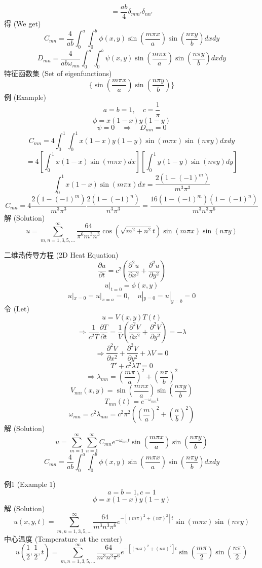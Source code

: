 \documentclass{article}
\begin{document}
	$$
	= \frac{ab}{4} \delta_{mm'} \delta_{nn'}
	$$
	得 (We get)
	$$
	C_{mn} = \frac{4}{ab} \int_0^a \int_0^b \phi(x,y) \sin(\frac{m\pi x}{a})\sin(\frac{n\pi y}{b}) dx dy
	$$
	$$
	D_{mn} = \frac{4}{ab \omega_{mn}} \int_0^a \int_0^b \psi(x,y) \sin(\frac{m\pi x}{a})\sin(\frac{n\pi y}{b}) dx dy
	$$
	特征函数集 (Set of eigenfunctions)
	$$
	\{ \sin(\frac{m\pi x}{a}) \sin(\frac{n\pi y}{b}) \}
	$$
	例 (Example)
	$$
	a=b=1, \quad c = \frac{1}{\pi}
	$$
	$$
	\phi = x(1-x)y(1-y)
	$$
	$$
	\psi = 0 \quad \Rightarrow \quad D_{mn}=0
	$$
	$$
	C_{mn} = 4 \int_0^1 \int_0^1 x(1-x)y(1-y) \sin(m\pi x)\sin(n\pi y) dx dy
	$$
	$$
	= 4 [\int_0^1 x(1-x) \sin(m\pi x) dx] [\int_0^1 y(1-y) \sin(n\pi y) dy]
	$$
	$$
	\int_0^1 x(1-x) \sin(m\pi x) dx = \frac{2(1-(-1)^m)}{m^3\pi^3}
	$$
	$$
	C_{mn} = 4 \frac{2(1-(-1)^m)}{m^3\pi^3} \frac{2(1-(-1)^n)}{n^3\pi^3} = \frac{16(1-(-1)^m)(1-(-1)^n)}{m^3 n^3 \pi^6}
	$$
	解 (Solution)
	$$
	u = \sum_{m,n=1,3,5,...}^{\infty} \frac{64}{\pi^6 m^3 n^3} \cos(\sqrt{m^2+n^2}t) \sin(m\pi x)\sin(n\pi y)
	$$
	
	二维热传导方程 (2D Heat Equation)
	$$
	\frac{\partial u}{\partial t} = c^2 (\frac{\partial^2 u}{\partial x^2} + \frac{\partial^2 u}{\partial y^2})
	$$
	$$
	u|_{t=0} = \phi(x,y)
	$$
	$$
	u|_{x=0}=u|_{x=a}=0, \quad u|_{y=0}=u|_{y=b}=0
	$$
	令 (Let)
	$$
	u=V(x,y)T(t)
	$$
	$$
	\Rightarrow \frac{1}{c^2 T} \frac{\partial T}{\partial t} = \frac{1}{V}(\frac{\partial^2 V}{\partial x^2} + \frac{\partial^2 V}{\partial y^2}) = -\lambda
	$$
	$$
	\Rightarrow \frac{\partial^2 V}{\partial x^2} + \frac{\partial^2 V}{\partial y^2} + \lambda V = 0
	$$
	$$
	T' + c^2 \lambda T = 0
	$$
	$$
	\Rightarrow \lambda_{mn} = (\frac{m\pi}{a})^2 + (\frac{n\pi}{b})^2
	$$
	$$
	V_{mn}(x,y) = \sin(\frac{m\pi x}{a})\sin(\frac{n\pi y}{b})
	$$
	$$
	T_{mn}(t) = e^{- \omega_{mn} t}
	$$
	$$
	\omega_{mn} = c^2 \lambda_{mn} = c^2\pi^2 ((\frac{m}{a})^2+(\frac{n}{b})^2)
	$$
	解 (Solution)
	$$
	u = \sum_{m=1}^{\infty} \sum_{n=1}^{\infty} C_{mn} e^{-\omega_{mn}t} \sin(\frac{m\pi x}{a})\sin(\frac{n\pi y}{b})
	$$
	$$
	C_{mn} = \frac{4}{ab} \int_0^a \int_0^b \phi(x,y) \sin(\frac{m\pi x}{a})\sin(\frac{n\pi y}{b}) dx dy
	$$
	
	例1 (Example 1)
	$$
	a=b=1, c=1
	$$
	$$
	\phi = x(1-x)y(1-y)
	$$
	解 (Solution)
	$$
	u(x,y,t) = \sum_{m,n=1,3,5,...}^{\infty} \frac{64}{m^3 n^3 \pi^6} e^{-[ (m\pi)^2 + (n\pi)^2 ]t} \sin(m\pi x)\sin(n\pi y)
	$$
	中心温度 (Temperature at the center)
	$$
	u(\frac{1}{2}, \frac{1}{2}, t) = \sum_{m,n=1,3,5,...}^{\infty} \frac{64}{m^3 n^3 \pi^6} e^{-[ (m\pi)^2 + (n\pi)^2 ]t} \sin(\frac{m\pi}{2})\sin(\frac{n\pi}{2})
	$$
	
\end{document}
